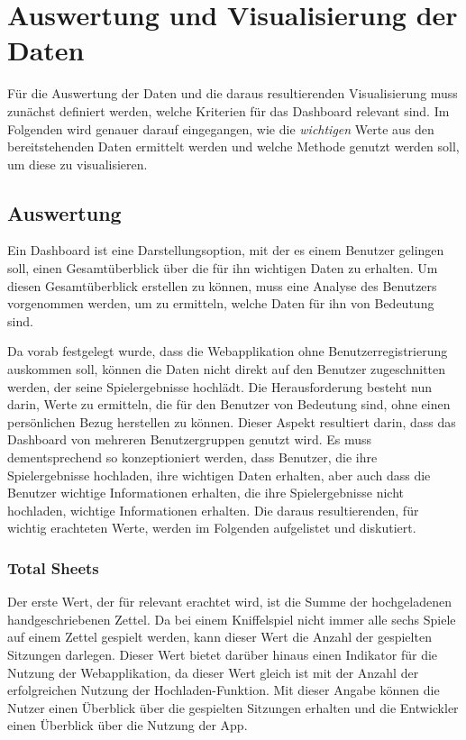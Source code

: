\section{Auswertung und Visualisierung der Daten}
Für die Auswertung der Daten und die daraus resultierenden Visualisierung muss zunächst definiert werden, welche Kriterien für das Dashboard relevant sind. Im Folgenden wird genauer darauf eingegangen, wie die \textit{wichtigen} Werte aus den bereitstehenden Daten ermittelt werden und welche Methode genutzt werden soll, um diese zu visualisieren.

\subsection{Auswertung}
Ein Dashboard ist eine Darstellungsoption, mit der es einem Benutzer gelingen soll, einen Gesamtüberblick über die für ihn wichtigen Daten zu erhalten. Um diesen Gesamtüberblick erstellen zu können, muss eine Analyse des Benutzers vorgenommen werden, um zu ermitteln, welche Daten für ihn von Bedeutung sind. \cite{few_2013}

Da vorab festgelegt wurde, dass die Webapplikation ohne Benutzerregistrierung auskommen soll, können die Daten nicht direkt auf den Benutzer zugeschnitten werden, der seine Spielergebnisse hochlädt. Die Herausforderung besteht nun darin, Werte zu ermitteln, die für den Benutzer von Bedeutung sind, ohne einen persönlichen Bezug herstellen zu können. Dieser Aspekt resultiert darin, dass das Dashboard von mehreren Benutzergruppen genutzt wird. Es muss dementsprechend so konzeptioniert werden, dass Benutzer, die ihre Spielergebnisse hochladen, ihre wichtigen Daten erhalten, aber auch dass die Benutzer wichtige Informationen erhalten, die ihre Spielergebnisse nicht hochladen, wichtige Informationen erhalten. Die daraus resultierenden, für wichtig erachteten Werte, werden im Folgenden aufgelistet und diskutiert.

\subsubsection{Total Sheets}
Der erste Wert, der für relevant erachtet wird, ist die Summe der hochgeladenen handgeschriebenen Zettel. Da bei einem Kniffelspiel nicht immer alle sechs Spiele auf einem Zettel gespielt werden, kann dieser Wert die Anzahl der gespielten Sitzungen darlegen. Dieser Wert bietet darüber hinaus einen Indikator für die Nutzung der Webapplikation, da dieser Wert gleich ist mit der Anzahl der erfolgreichen Nutzung der Hochladen-Funktion. Mit dieser Angabe können die Nutzer einen Überblick über die gespielten Sitzungen erhalten und die Entwickler einen Überblick über die Nutzung der App.

